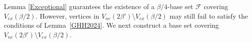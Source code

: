 \documentclass[11pt, a4paper]{article}
\theoremstyle{definition}
\newcommand{\<}{\subseteq}
\begin{document}
Lemma \ref{Exceptional} guarantees the existence of a $\beta/4$-base set $\mathcal{F}$ covering $V_{ex}(\beta/2)$. However, vertices in $V_{ne}(2\beta')\setminus V_{ex}(\beta/2)$ may still fail to satisfy the conditions of Lemma~\ref{GHH2024}. We  %
next construct a base set covering $V_{ne}(2\beta')\setminus V_{ex}(\beta/2)$. %

\end{document}

